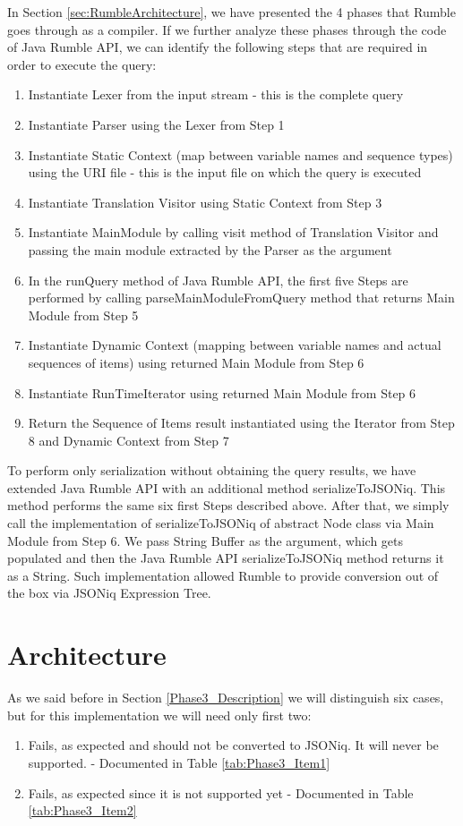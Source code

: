 In Section \ref{sec:RumbleArchitecture}, we have presented the 4 phases that Rumble goes through as a compiler. If we further analyze these phases through the code of Java Rumble API, we can identify the following steps that are required in order to execute the query:
\begin{enumerate}
	\item Instantiate Lexer from the input stream - this is the complete query
	\item Instantiate Parser using the Lexer from Step 1
	\item Instantiate Static Context  (map between variable names and sequence types) using the URI file - this is the input file on which the query is executed 
	\item Instantiate Translation Visitor using Static Context from Step 3
	\item Instantiate MainModule by calling visit method of Translation Visitor and passing the main module extracted by the Parser as the argument
	\item In the runQuery method of Java Rumble API, the first five Steps are performed by calling parseMainModuleFromQuery method that returns Main Module from Step 5
	\item Instantiate Dynamic Context (mapping between variable names and actual sequences of items) using returned Main Module from Step 6
	\item Instantiate RunTimeIterator using returned Main Module from Step 6
	\item Return the Sequence of Items result instantiated using the Iterator from Step 8 and Dynamic Context from Step 7
\end{enumerate}

To perform only serialization without obtaining the query results, we have extended Java Rumble API with an additional method serializeToJSONiq. This method performs the same six first Steps described above. After that, we simply call the implementation of serializeToJSONiq of abstract Node class via Main Module from Step 6. We pass String Buffer as the argument, which gets populated and then the Java Rumble API serializeToJSONiq method returns it as a String. Such implementation allowed Rumble to provide conversion out of the box via JSONiq Expression Tree.

\section{Architecture}
\label{sec:TestConverterImplementation}
As we said before in Section \ref{Phase3_Description} we will distinguish six cases, but for this implementation we will need only first two: 
\begin{enumerate}
	\item Fails, as expected and should not be converted to JSONiq. It will never be supported. - Documented in Table \ref{tab:Phase3_Item1}
	\item Fails, as expected since it is not supported yet - Documented in Table \ref{tab:Phase3_Item2}
\end{enumerate}

